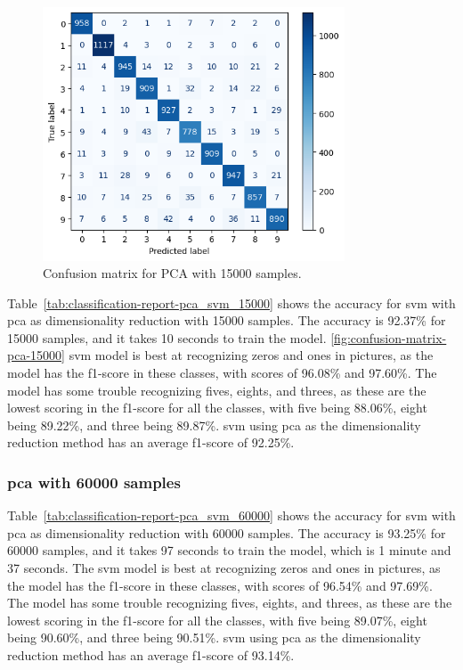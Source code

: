 \begin{figure}[htb!]
    \centering
    \includegraphics[width=0.8\textwidth]{figures/1-experiment/confusion_matrix_pca_svm_15000.png}
    \caption{Confusion matrix for PCA with 15000 samples.}
    \label{fig:confusion-matrix-pca-15000}
\end{figure}


Table~\ref{tab:classification-report-pca_svm_15000} shows the accuracy for \gls{svm} with \gls{pca} as dimensionality reduction with 15000 samples. The accuracy is 92.37\% for 15000 samples, and it takes 10 seconds to train the model. \autoref{fig:confusion-matrix-pca-15000} \gls{svm} model is best at recognizing zeros and ones in pictures, as the model has the f1-score in these classes, with scores of 96.08\% and 97.60\%. The model has some trouble recognizing fives, eights, and threes, as these are the lowest scoring in the f1-score for all the classes, with five being 88.06\%, eight being 89.22\%, and three being 89.87\%. \gls{svm} using \gls{pca} as the dimensionality reduction method has an average f1-score of 92.25\%.

\subsubsection{\gls{pca} with 60000 samples}\label{subsubsec:experiment-1-results-pca-60000}



Table~\ref{tab:classification-report-pca_svm_60000} shows the accuracy for \gls{svm} with \gls{pca} as dimensionality reduction with 60000 samples. The accuracy is 93.25\% for 60000 samples, and it takes 97 seconds to train the model, which is 1 minute and 37 seconds. The \gls{svm} model is best at recognizing zeros and ones in pictures, as the model has the f1-score in these classes, with scores of 96.54\% and 97.69\%. The model has some trouble recognizing fives, eights, and threes, as these are the lowest scoring in the f1-score for all the classes, with five being 89.07\%, eight being 90.60\%, and three being 90.51\%. \gls{svm} using \gls{pca} as the dimensionality reduction method has an average f1-score of 93.14\%.

